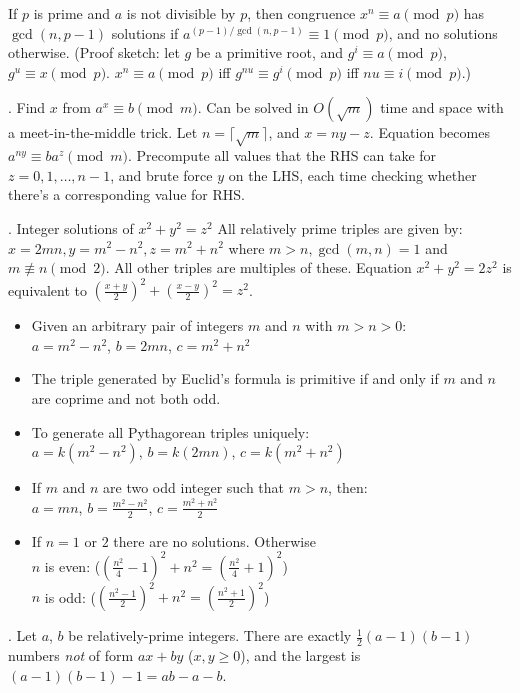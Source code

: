 If $p$ is prime and $a$ is not divisible by $p$, then congruence
$x^n \equiv a \pmod{p}$ has $\gcd(n, p-1)$ solutions if
$a^{(p-1)/\gcd(n,p-1)} \equiv 1 \pmod{p}$, and no solutions otherwise.
(Proof sketch: let $g$ be a primitive root, and
$g^i \equiv a \pmod{p}$, $g^u \equiv x \pmod{p}$.
$x^n \equiv a \pmod{p}$ iff $g^{nu} \equiv g^i \pmod{p}$ iff $nu \equiv i \pmod{p}$.)

.  Find $x$ from $a^x \equiv b \pmod{m}$.
Can be solved in $O(\sqrt{m})$ time and space with a meet-in-the-middle trick.
Let $n = \lceil \sqrt{m} \rceil$, and $x = ny - z$.
Equation becomes $a^{ny} \equiv b a^z \pmod{m}$.  Precompute all values that
the RHS can take for $z = 0, 1, \dots, n-1$, and brute force $y$ on the LHS,
each time checking whether there's a corresponding value for RHS.

.  Integer solutions of $x^2 + y^2 = z^2$
All relatively prime triples are given by:
$x=2mn, y=m^2-n^2, z=m^2+n^2$ where $m>n, \gcd(m,n)=1$ and $m \not\equiv n \pmod{2}$.
All other triples are multiples of these.
Equation $x^2 + y^2 = 2z^2$ is equivalent to $(\frac{x+y}{2})^2 + (\frac{x-y}{2})^2 = z^2$.
\begin{itemize}
\item Given an arbitrary pair of integers $m$ and $n$ with $m > n > 0$:\\
$a = m^2 - n^2$, $b = 2mn$, $c = m^2 + n^2$
\item The triple generated by Euclid's formula is primitive if and only if $m$ and $n$ are coprime and not both odd.
\item To generate all Pythagorean triples uniquely:\\
$a = k (m^2 - n^2)$, $b = k(2mn)$, $c = k(m^2 + n^2)$
\item If $m$ and $n$ are two odd integer such that $m > n$, then:\\
$a = mn$, $b = \frac{m^2 - n^2}{2}$, $c = \frac{m^2 + n^2}{2}$
\item If $n=1$ or $2$ there are no solutions. Otherwise\\
$n$ is even: ($(\frac{n^2}{4} - 1)^2 + n^2 = (\frac{n^2}{4} + 1)^2$)\\
$n$ is odd: ($(\frac{n^2 - 1}{2})^2 + n^2 = (\frac{n^2 + 1}{2})^2$)
\end{itemize}


.  Let $a$, $b$ be relatively-prime integers.
There are exactly $\frac{1}{2}(a-1)(b-1)$ numbers \emph{not} of form $ax+by$ ($x,y \ge 0$),
and the largest is $(a-1)(b-1)-1 = ab - a - b$.

